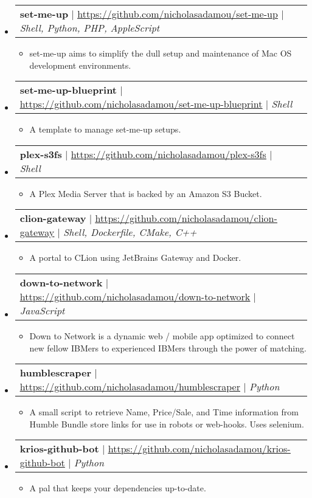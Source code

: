 \documentclass[letterpaper,11pt]{article}
\makeatletter
\newcommand{\resumeItemBulletless}[1]{
  \item[] \small{
    {#1 \vspace{-2pt}}
  }
}
\newcommand{\resumeProjectHeading}[2]{
    \item
    \begin{tabular*}{0.97\textwidth}{l@{\extracolsep{\fill}}r}
      \small#1 & #2 \\
    \end{tabular*}\vspace{-7pt}
}
\newcommand{\resumeSubHeadingListStart}{\begin{itemize}[leftmargin=0.15in, label={}]}
\newcommand{\resumeSubHeadingListEnd}{\end{itemize}}
\newcommand{\resumeItemListStart}{\begin{itemize}[rightmargin=\dimexpr\linewidth-17.25cm-\leftmargin\relax]}
\newcommand{\resumeItemListEnd}{\end{itemize}\vspace{-5pt}}
\makeatother
\begin{document}
\resumeSubHeadingListStart

\resumeProjectHeading
{\textbf{set-me-up} $|$ \href{https://github.com/nicholasadamou/set-me-up}{\underline{https://github.com/nicholasadamou/set-me-up}} $|$ \emph{Shell, Python, PHP, AppleScript}}{}
\resumeItemListStart
\resumeItemBulletless{set-me-up aims to simplify the dull setup and maintenance of Mac OS development environments.}
\resumeItemListEnd

\resumeProjectHeading
{\textbf{set-me-up-blueprint} $|$ \href{https://github.com/nicholasadamou/set-me-up-blueprint}{\underline{https://github.com/nicholasadamou/set-me-up-blueprint}} $|$ \emph{Shell}}{}
\resumeItemListStart
\resumeItemBulletless{A template to manage set-me-up setups.}
\resumeItemListEnd

\resumeProjectHeading
{\textbf{plex-s3fs} $|$ \href{https://github.com/nicholasadamou/plex-s3fs}{\underline{https://github.com/nicholasadamou/plex-s3fs}} $|$ \emph{Shell}}{}
\resumeItemListStart
\resumeItemBulletless{A Plex Media Server that is backed by an Amazon S3 Bucket.}
\resumeItemListEnd

\resumeProjectHeading
{\textbf{clion-gateway} $|$ \href{https://github.com/nicholasadamou/clion-gateway}{\underline{https://github.com/nicholasadamou/clion-gateway}} $|$ \emph{Shell, Dockerfile, CMake, C++}}{}
\resumeItemListStart
\resumeItemBulletless{A portal to CLion using JetBrains Gateway and Docker.}
\resumeItemListEnd

\resumeProjectHeading
{\textbf{down-to-network} $|$ \href{https://github.com/nicholasadamou/down-to-network}{\underline{https://github.com/nicholasadamou/down-to-network}} $|$ \emph{JavaScript}}{}
\resumeItemListStart
\resumeItemBulletless{Down to Network is a dynamic web / mobile app optimized to connect new fellow IBMers to experienced IBMers through the power of matching.}
\resumeItemListEnd

\resumeProjectHeading
{\textbf{humblescraper} $|$ \href{https://github.com/nicholasadamou/humblescraper}{\underline{https://github.com/nicholasadamou/humblescraper}} $|$ \emph{Python}}{}
\resumeItemListStart
\resumeItemBulletless{A small script to retrieve Name, Price/Sale, and Time information from Humble Bundle store links for use in robots or web-hooks. Uses selenium.}
\resumeItemListEnd

\resumeProjectHeading
{\textbf{krios-github-bot} $|$ \href{https://github.com/nicholasadamou/krios-github-bot}{\underline{https://github.com/nicholasadamou/krios-github-bot}} $|$ \emph{Python}}{}
\resumeItemListStart
\resumeItemBulletless{A pal that keeps your dependencies up-to-date.}
\resumeItemListEnd

\resumeSubHeadingListEnd

\end{document}
